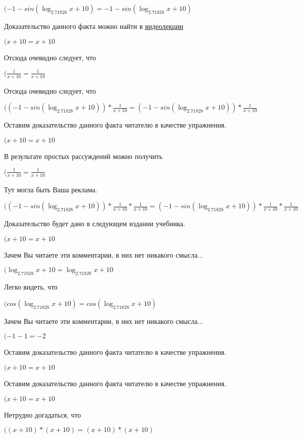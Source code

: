 \documentclass[12pt,a4paper,fleqn]{article}
\theoremstyle{definition}
\begin{document}
$( -1  - sin(\log_{ 2.71828 }{ x  +  10 }) =  -1  - sin(\log_{ 2.71828 }{ x  +  10 })$

Доказательство данного факта можно найти в \href{https://www.youtube.com/watch?v=dQw4w9WgXcQ}{видеолекции}

$( x  +  10  =  x  +  10 $

Отсюда очевидно следует, что

$(\frac{ 1 }{ x  +  10 }
 = \frac{ 1 }{ x  +  10 }
$

Отсюда очевидно следует, что

$(( -1  - sin(\log_{ 2.71828 }{ x  +  10 })) * \frac{ 1 }{ x  +  10 }
 = ( -1  - sin(\log_{ 2.71828 }{ x  +  10 })) * \frac{ 1 }{ x  +  10 }
$

Оставим доказательство данного факта читателю в качестве упражнения.

$( x  +  10  =  x  +  10 $

В результате простых рассуждений можно получить

$(\frac{ 1 }{ x  +  10 }
 = \frac{ 1 }{ x  +  10 }
$

Тут могла быть Ваша реклама.

$(( -1  - sin(\log_{ 2.71828 }{ x  +  10 })) * \frac{ 1 }{ x  +  10 }
 * \frac{ 1 }{ x  +  10 }
 = ( -1  - sin(\log_{ 2.71828 }{ x  +  10 })) * \frac{ 1 }{ x  +  10 }
 * \frac{ 1 }{ x  +  10 }
$

Доказательство будет дано в следующем издании учебника.

$( x  +  10  =  x  +  10 $

Зачем Вы читаете эти комментарии, в них нет никакого смысла...

$(\log_{ 2.71828 }{ x  +  10 } = \log_{ 2.71828 }{ x  +  10 }$

Легко видеть, что

$(cos(\log_{ 2.71828 }{ x  +  10 }) = cos(\log_{ 2.71828 }{ x  +  10 })$

Зачем Вы читаете эти комментарии, в них нет никакого смысла...

$( -1  -  1  =  -2 $

Оставим доказательство данного факта читателю в качестве упражнения.

$( x  +  10  =  x  +  10 $

Оставим доказательство данного факта читателю в качестве упражнения.

$( x  +  10  =  x  +  10 $

Нетрудно догадаться, что

$(( x  +  10 ) * ( x  +  10 ) = ( x  +  10 ) * ( x  +  10 )$
\end{document}
